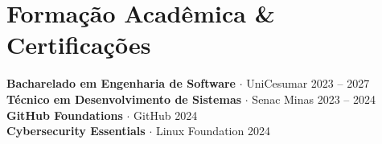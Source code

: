 \documentclass[a4paper,11pt]{article}
\begin{document}
\section{Formação Acadêmica \& Certificações}
\textbf{Bacharelado em Engenharia de Software} $\cdot$ UniCesumar
\hfill 2023 -- 2027 \\
\textbf{Técnico em Desenvolvimento de Sistemas} $\cdot$ Senac Minas
\hfill 2023 -- 2024 \\
\textbf{GitHub Foundations} $\cdot$ GitHub \hfill 2024 \\
\textbf{Cybersecurity Essentials} $\cdot$ Linux Foundation \hfill 2024

\end{document}
